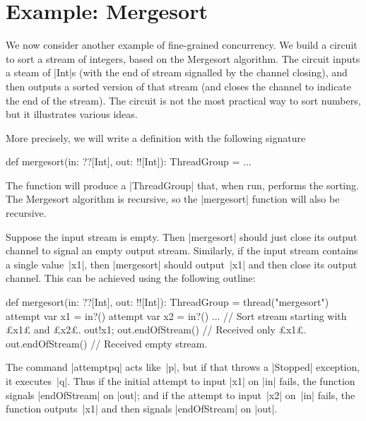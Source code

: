 \section{Example: Mergesort}
\label{sec:mergesort}

We now consider another example of fine-grained 
concurrency.  We build a circuit to sort a
stream of integers, based on the 
Mergesort algorithm.  The circuit inputs a steam of |Int|s
(with the end of stream signalled by the channel closing), and then outputs a
sorted version of that stream (and closes the channel to indicate the end of
the stream).  The circuit is not the most practical way to sort numbers, but
it illustrates various ideas.

More precisely, we will write a  definition with the following signature
%
\begin{scala}
  def mergesort(in: ??[Int], out: !![Int]): ThreadGroup = ...
\end{scala}
%
The function will produce a |ThreadGroup| that, when run, performs the
sorting.  The Mergesort algorithm is recursive, so the |mergesort| function
will also be recursive.

Suppose the input stream is empty.  Then |mergesort| should just close its
output channel to signal an empty output stream.  Similarly, if the input
stream contains a single value~|x1|, then |mergesort| should output~|x1| and
then close its output channel.  This can be achieved using the following
outline:
%
\begin{mysamepage}
\begin{scala}
  def mergesort(in: ??[Int], out: !![Int]): ThreadGroup = thread("mergesort"){
    attempt{ 
      var x1 = in?()
      attempt{
        var x2 = in?()
        ...   // Sort stream starting with £x1£ and £x2£.
      }{ out!x1; out.endOfStream() } // Received only £x1£.
    }{ out.endOfStream() } // Received empty stream.
  }
\end{scala}
\end{mysamepage}
%
The command |attempt{p}{q}| acts like~|p|, but if that
throws a |Stopped| exception, it executes~|q|.
Thus if the initial attempt to input |x1| on |in| fails, the function signals
|endOfStream| on |out|; and if the attempt to input~|x2| on~|in| fails, the
function outputs~|x1| and then signals |endOfStream| on |out|.

